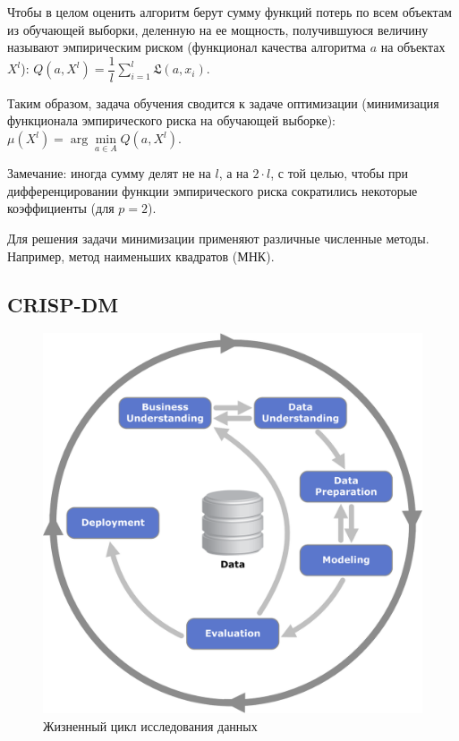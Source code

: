 Чтобы в целом оценить алгоритм берут сумму функций потерь по всем объектам из обучающей выборки, деленную на ее мощность, получившуюся величину называют эмпирическим риском (функционал качества алгоритма $a$ на объектах $X^l$): $Q(a, X^l) = \dfrac{1}{l}\sum\limits_{i=1}^{l}\mathfrak{L}(a,x_i)$.

Таким образом, задача обучения сводится к задаче оптимизации (минимизация функционала эмпирического риска на обучающей выборке): $\mu(X^l) = \arg\min\limits_{a \in A} Q(a,X^l)$.

Замечание: иногда сумму делят не на $l$, а на $2 \cdot l$, с той целью, чтобы при дифференцировании функции эмпирического риска сократились некоторые коэффициенты (для $p=2$).

Для решения задачи минимизации применяют различные численные методы. Например, метод наименьших квадратов (МНК).


\subsection{CRISP-DM}

\begin{figure} 
    \vspace{-2ex}
    \includegraphics[width=\linewidth]{src/img/CRISP-DM_process_diagram.png}
    \caption{Жизненный цикл исследования данных \cite{wiki:crisp_dm}}
    \label{fig:crisp_dm}
\end{figure}

